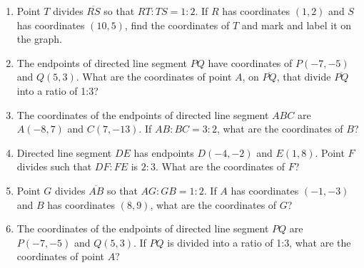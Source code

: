 \begin{enumerate}
\item Point $T$ divides $\overline{RS}$ so that $RT:TS = 1:2$. If $R$ has coordinates $(1,2)$ and $S$ has coordinates $(10,5)$, find the coordinates of $T$ and mark and label it on the graph.
\begin{flushright}
\end{flushright} 
    
\item The endpoints of directed line segment $PQ$ have coordinates of
$P(-7,-5)$ and $Q(5,3)$. What are the coordinates of point $A$, on $\overline{PQ}$, that divide $\overline{PQ}$ into a ratio of 1:3?

\item The coordinates of the endpoints of directed line segment $ABC$ are $A(-8,7)$ and $C(7,-13)$. If $AB:BC = 3:2$, what are the coordinates of $B$?

\item Directed line segment $DE$ has endpoints $D(-4, -2)$ and $E(1,8)$.
Point $F$ divides such that $DF:FE$ is $2:3$. What are the coordinates
of $F$?

\item Point $G$ divides $\overline{AB}$ so that $AG:GB = 1:2$. If $A$ has coordinates $(-1,-3)$ and $B$ has coordinates $(8,9)$, what are the coordinates of $G$?

\item The coordinates of the endpoints of directed line segment $PQ$ are $P(-7,-5)$ and $Q(5,3)$. If $PQ$ is divided into a ratio of 1:3, what are the coordinates of point $A$?


\end{enumerate}
